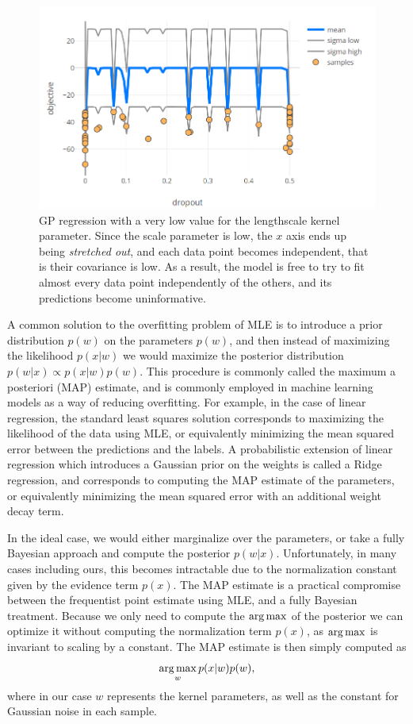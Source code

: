 \begin{figure}
	\begin{center}
		\includegraphics[width=1.0\textwidth]{images/overfitting-gp.png}
		\caption{GP regression with a very low value for the lengthscale kernel parameter. Since the scale parameter is low, the $x$ axis ends up being \emph{stretched out}, and each data point becomes independent, that is their covariance is low. As a result, the model is free to try to fit almost every data point independently of the others, and its predictions become uninformative.}
		\label{figure:overfitting-gp}
	\end{center}
\end{figure}

A common solution to the overfitting problem of MLE is to introduce a prior distribution $p(w)$ on the parameters $p(w)$, and then instead of maximizing the likelihood $p(x|w)$ we would maximize the posterior distribution $p(w | x) \propto p(x | w) p(w)$. This procedure is commonly called the maximum a posteriori (MAP) estimate, and is commonly employed in machine learning models as a way of reducing overfitting. For example, in the case of linear regression, the standard least squares solution corresponds to maximizing the likelihood of the data using MLE, or equivalently minimizing the mean squared error between the predictions and the labels. A probabilistic extension of linear regression which introduces a Gaussian prior on the weights is called a Ridge regression, and corresponds to computing the MAP estimate of the parameters, or equivalently minimizing the mean squared error with an additional weight decay term.

In the ideal case, we would either marginalize over the parameters, or take a fully Bayesian approach and compute the posterior $p(w | x)$. Unfortunately, in many cases including ours, this becomes intractable due to the normalization constant given by the evidence term $p(x)$. The MAP estimate is a practical compromise between the frequentist point estimate using MLE, and a fully Bayesian treatment. Because we only need to compute the $\operatorname*{arg\,max}$ of the posterior we can optimize it without computing the normalization term $p(x)$, as $\operatorname*{arg\,max}$ is invariant to scaling by a constant. The MAP estimate is then simply computed as $$ \operatorname*{arg\,max}_w p(x|w) p(w), $$ where in our case $w$ represents the kernel parameters, as well as the constant for Gaussian noise in each sample.

